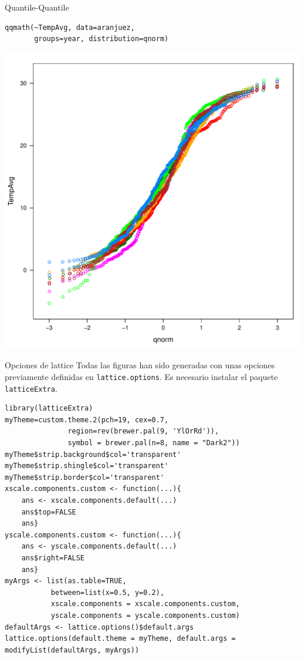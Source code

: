 \documentclass[xcolor={usenames,svgnames,dvipsnames}]{beamer}
\begin{document}
\begin{frame}[fragile,label=sec-2-1-27]{Quantile-Quantile}
 \lstset{language=R,numbers=none}
\begin{lstlisting}
qqmath(~TempAvg, data=aranjuez,
       groups=year, distribution=qnorm)
\end{lstlisting}

\includegraphics[width=.9\linewidth]{figs/qqNorm.pdf}
\end{frame}
\begin{frame}[fragile,label=sec-2-1-28]{Opciones de lattice}
 Todas las figuras han sido generadas con unas opciones previamente
definidas en \texttt{lattice.options}. Es necesario instalar el paquete
\texttt{latticeExtra}.
\lstset{language=R,numbers=none}
\begin{lstlisting}
library(latticeExtra)
myTheme=custom.theme.2(pch=19, cex=0.7,
		       region=rev(brewer.pal(9, 'YlOrRd')),
		       symbol = brewer.pal(n=8, name = "Dark2"))
myTheme$strip.background$col='transparent'
myTheme$strip.shingle$col='transparent'
myTheme$strip.border$col='transparent'
xscale.components.custom <- function(...){
    ans <- xscale.components.default(...)
    ans$top=FALSE
    ans}
yscale.components.custom <- function(...){
    ans <- yscale.components.default(...)
    ans$right=FALSE
    ans}
myArgs <- list(as.table=TRUE,
	       between=list(x=0.5, y=0.2),
	       xscale.components = xscale.components.custom,
	       yscale.components = yscale.components.custom)
defaultArgs <- lattice.options()$default.args
lattice.options(default.theme = myTheme, default.args = modifyList(defaultArgs, myArgs))
\end{lstlisting}
\end{frame}
\end{document}
